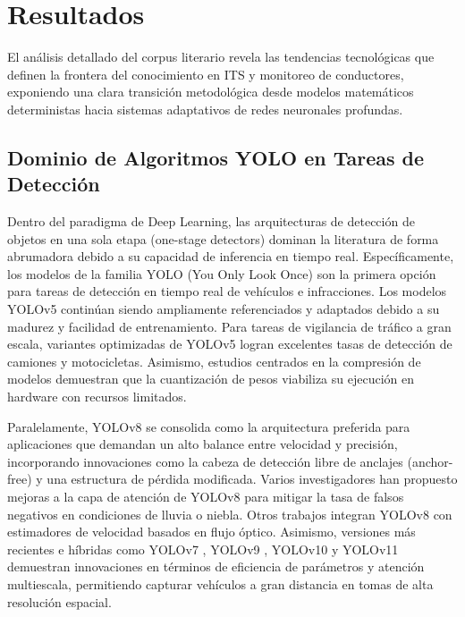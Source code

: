\section{Resultados}
El análisis detallado del corpus literario revela las tendencias tecnológicas que definen la frontera del conocimiento en ITS y monitoreo de conductores, exponiendo una clara transición metodológica desde modelos matemáticos deterministas hacia sistemas adaptativos de redes neuronales profundas.

\subsection{Dominio de Algoritmos YOLO en Tareas de Detección}
Dentro del paradigma de Deep Learning, las arquitecturas de detección de objetos en una sola etapa (one-stage detectors) dominan la literatura de forma abrumadora debido a su capacidad de inferencia en tiempo real. Específicamente, los modelos de la familia YOLO (You Only Look Once) son la primera opción para tareas de detección en tiempo real de vehículos e infracciones. Los modelos YOLOv5 \cite{kumar2026uavbased, chen2026hybrid} continúan siendo ampliamente referenciados y adaptados debido a su madurez y facilidad de entrenamiento. Para tareas de vigilancia de tráfico a gran escala, variantes optimizadas de YOLOv5 \cite{zia2025advancing, yang2025computer} logran excelentes tasas de detección de camiones y motocicletas. Asimismo, estudios centrados en la compresión de modelos \cite{essahraui2025realtime, jing2025traffic} demuestran que la cuantización de pesos viabiliza su ejecución en hardware con recursos limitados.

Paralelamente, YOLOv8 \cite{pavan2026aipowered, essahraui2025realtime} se consolida como la arquitectura preferida para aplicaciones que demandan un alto balance entre velocidad y precisión, incorporando innovaciones como la cabeza de detección libre de anclajes (anchor-free) y una estructura de pérdida modificada. Varios investigadores han propuesto mejoras a la capa de atención de YOLOv8 \cite{satya2025utilization, le2025redlight} para mitigar la tasa de falsos negativos en condiciones de lluvia o niebla. Otros trabajos \cite{silva2025light, oussouaddi2025dsryolo} integran YOLOv8 con estimadores de velocidad basados en flujo óptico. Asimismo, versiones más recientes e híbridas como YOLOv7 \cite{liu2026research, alshehri2025integrated}, YOLOv9 \cite{xie2025yoloace}, YOLOv10  y YOLOv11  demuestran innovaciones en términos de eficiencia de parámetros y atención multiescala, permitiendo capturar vehículos a gran distancia en tomas de alta resolución espacial.

